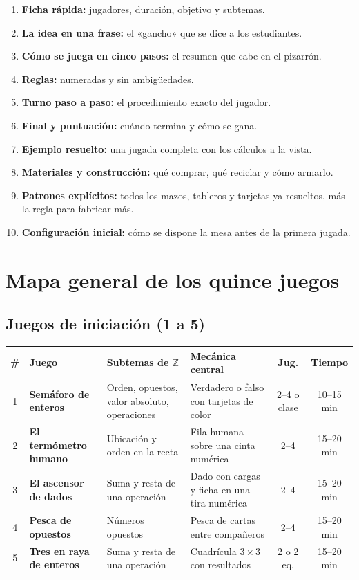 \documentclass[12pt, letterpaper]{article}
\newcommand{\Z}{\mathbb{Z}}
\begin{document}
\begin{enumerate}[leftmargin=*]
  \item \textbf{Ficha rápida:} jugadores, duración, objetivo y subtemas.
  \item \textbf{La idea en una frase:} el «gancho» que se dice a los estudiantes.
  \item \textbf{Cómo se juega en cinco pasos:} el resumen que cabe en el pizarrón.
  \item \textbf{Reglas:} numeradas y sin ambigüedades.
  \item \textbf{Turno paso a paso:} el procedimiento exacto del jugador.
  \item \textbf{Final y puntuación:} cuándo termina y cómo se gana.
  \item \textbf{Ejemplo resuelto:} una jugada completa con los cálculos a la vista.
  \item \textbf{Materiales y construcción:} qué comprar, qué reciclar y cómo armarlo.
  \item \textbf{Patrones explícitos:} todos los mazos, tableros y tarjetas ya resueltos, más la regla para fabricar más.
  \item \textbf{Configuración inicial:} cómo se dispone la mesa antes de la primera jugada.
\end{enumerate}

\section*{Mapa general de los quince juegos}

\subsection*{Juegos de iniciación (1 a 5)}

\begin{center}
\footnotesize
\setlength{\tabcolsep}{4pt}
\begin{tabular}{@{}c l p{3.6cm} p{4.6cm} c c@{}}
\toprule
\textbf{\#} & \textbf{Juego} & \textbf{Subtemas de $\Z$} & \textbf{Mecánica central} & \textbf{Jug.} & \textbf{Tiempo}\\
\midrule
1 & \textbf{Semáforo de enteros} & Orden, opuestos, valor absoluto, operaciones & Verdadero o falso con tarjetas de color & 2--4 o clase & 10--15 min\\
2 & \textbf{El termómetro humano} & Ubicación y orden en la recta & Fila humana sobre una cinta numérica & 2--4 & 15--20 min\\
3 & \textbf{El ascensor de dados} & Suma y resta de una operación & Dado con cargas y ficha en una tira numérica & 2--4 & 15--20 min\\
4 & \textbf{Pesca de opuestos} & Números opuestos & Pesca de cartas entre compañeros & 2--4 & 15--20 min\\
5 & \textbf{Tres en raya de enteros} & Suma y resta de una operación & Cuadrícula $3\times 3$ con resultados & 2 o 2 eq. & 15--20 min\\
\bottomrule
\end{tabular}
\end{center}
\end{document}
